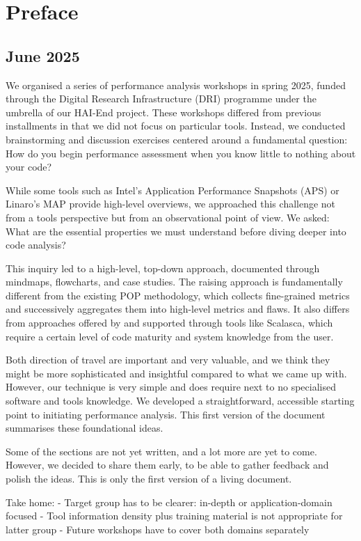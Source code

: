 \chapter*{Preface}


\section*{June 2025}

We organised a series of performance analysis workshops in spring 2025, funded through the Digital Research Infrastructure (DRI) programme under the umbrella of our HAI-End project. 
These workshops differed from previous installments in that we did not focus on particular tools. 
Instead, we conducted brainstorming and discussion exercises centered around a fundamental question: 
How do you begin performance assessment when you know little to nothing about your code?


While some tools such as Intel's Application Performance Snapshots (APS) or Linaro's MAP provide high-level overviews, we approached this challenge not from a tools perspective but from an observational point of view. 
We asked: 
What are the essential properties we must understand before diving deeper into code analysis?


This inquiry led to a high-level, top-down approach, documented through mindmaps, flowcharts, and case studies. 
The raising approach is fundamentally different from the existing POP methodology, which collects fine-grained metrics and successively aggregates them into high-level metrics and flaws. 
It also differs from approaches offered by and supported through tools like Scalasca, which require a certain level of code maturity and system knowledge from the user.


Both direction of travel are important and very valuable, and we think they might be more sophisticated and insightful compared to what we came up with.
However, our technique is very simple and does require next to no specialised software and tools knowledge.
We developed a straightforward, accessible starting point to initiating performance analysis.
This first version of the document summarises these foundational ideas.


Some of the sections are not yet written, and a lot more are  yet to come. 
However, we decided to share them early, to be able to gather feedback and polish the ideas.
This is only the first version of a living document.


Take home: 
- Target group has to be clearer: in-depth or application-domain focused
- Tool information density plus training material is not appropriate for latter group
- Future workshops have to cover both domains separately

